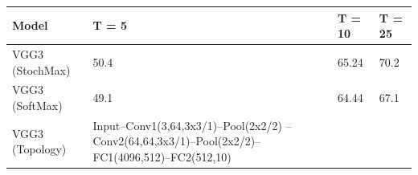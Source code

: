 \begin{tabular}{llll}
\toprule
Model & T = 5 & T = 10 & T = 25 \\
\midrule
VGG3 (StochMax) & 50.4 & 65.24 & 70.2 \\
VGG3 (SoftMax) & 49.1 & 64.44 & 67.1 \\
VGG3 (Topology) & Input–Conv1(3,64,3x3/1)–Pool(2x2/2) –Conv2(64,64,3x3/1)–Pool(2x2/2)– FC1(4096,512)–FC2(512,10) &  &  \\
\bottomrule
\end{tabular}
